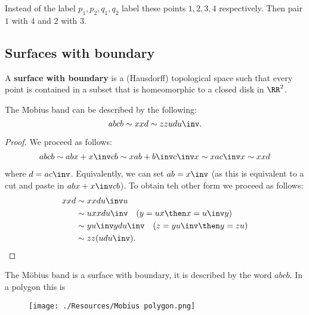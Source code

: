 \documentclass[12pt, a4paper]{article}
\begin{document}
\begin{mdnote}
    Instead of the label \(p_1,p_2,q_1,q_2\) label these points \(1,2,3,4\) respectively. Then pair \(1\) with \(4\) and \(2\) with \(3\). 
\end{mdnote}

\subsection{Surfaces with boundary}

\begin{definition}
    A \textbf{surface with boundary} is a (Hausdorff) topological space such that every point is contained in a subset that is homeomorphic to a closed disk in \(\RR^2\).
\end{definition}



\begin{mdprop}
    The Mobius band can be described by the following:
    \[abcb \sim xxd \sim zzudu\inv.\]
\end{mdprop}

\begin{proof}
    We proceed as follows:
    \[\begin{aligned}
        abcb\sim abx+x\inv cb \sim xab+b\inv c\inv x \sim xac\inv x\sim xxd
    \end{aligned}\]
    where \(d=ac\inv\). Equivalently, we can set \(ab=x\inv\) (as this is equivalent to a cut and paste in \(abx+x\inv cb\)). To obtain teh other form we proceed as follows:
    \[\begin{aligned}
        xxd &\sim xxdu\inv u \\
        &\sim ux xdu\inv \quad (y=ux \then x=u\inv y)\\
        &\sim yu\inv ydu\inv \quad (z=yu\inv \then y=zu) \\
        &\sim zz(udu\inv).
    \end{aligned}\]
\end{proof}

\begin{mdexample}
    The Möbius band is a surface with boundary, it is described by the word \(abcb\). In a polygon this is
    \begin{figure}[H]
         \begin{center}
             \texttt{[image: ./Resources/Mobius polygon.png]}
         \end{center}
    \end{figure}
\end{mdexample}
\end{document}
